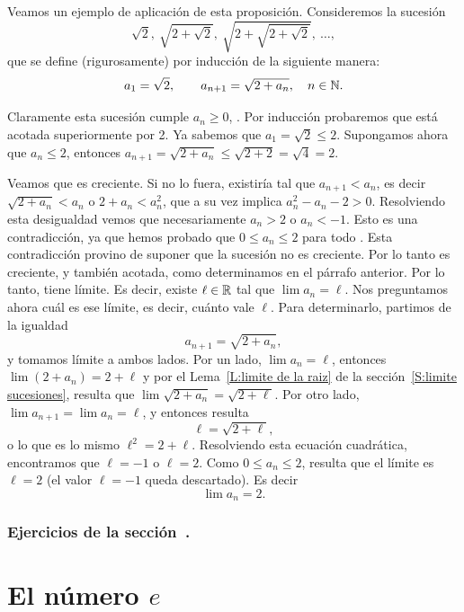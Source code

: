 \begin{example}
Veamos un ejemplo de aplicación de esta proposición. Consideremos la sucesión
\[
\sqrt2,\ \sqrt{2+\sqrt2},\ \sqrt{2+\sqrt{2+\sqrt2}},\ \dots,
\]
que se define (rigurosamente) por inducción de la siguiente manera:
\[
a_1 = \sqrt{2},\qquad
a_{n+1} = \sqrt{2+a_n}, \quad {\ensuremath{n\in\mathbb{N}}}.
\]

Claramente esta sucesión cumple $a_n \ge 0$, \niN.
Por inducción probaremos que está acotada superiormente por 2.
Ya sabemos que $a_1 = \sqrt2 \le 2$. Supongamos ahora que $a_n \le 2$, entonces $a_{n+1} = \sqrt{2 + a_n} \le \sqrt{2 + 2} = \sqrt{4}=2$.

Veamos que es creciente. Si no lo fuera, existiría \niN tal que $a_{n+1} < a_n$, es decir $\sqrt{2+a_n} < a_n$ o $2+a_n < a_n^2$, que a su vez implica $a_n^2 - a_n - 2 > 0$. Resolviendo esta desigualdad vemos que necesariamente $a_n > 2$ o $a_n < -1$. Esto es una contradicción, ya que hemos probado que $0\le a_n \le 2$ para todo \niN. Esta contradicción provino de suponer que la sucesión no es creciente. Por lo tanto es creciente, y también acotada, como determinamos en el párrafo anterior.
Por lo tanto, tiene límite. Es decir, existe $\ell \in \mathbb{R}$ tal que $\lim a_n = \ell$.
Nos preguntamos ahora cuál es ese límite, es decir, cuánto vale $\ell$.
Para determinarlo, partimos de la igualdad 
\[ a_{n+1} = \sqrt{2+a_n}, \]
y tomamos límite a ambos lados.
Por un lado, $\lim a_n = \ell$, entonces $\lim (2+a_n) = 2+\ell$ y por el Lema~\ref{L:limite de la raiz} de la sección~\ref{S:limite sucesiones}, resulta que $\lim \sqrt{2 + a_n} = \sqrt{2+\ell}$.
Por otro lado, $\lim a_{n+1} = \lim a_n = \ell$, y entonces resulta
\[
\ell = \sqrt{2+\ell},
\]
o lo que es lo mismo $\ell^2 = 2 + \ell$. Resolviendo esta ecuación cuadrática, encontramos que $\ell = -1$ o $\ell = 2$. Como $0 \le a_n \le 2$, resulta que el límite es $\ell=2$ (el valor $\ell=-1$ queda descartado). Es decir
\[
\lim a_n = 2.
\]
\end{example}

\subsubsection*{Ejercicios de la sección~.}

\begin{enumerate}

\end{enumerate}

\section{El número \texorpdfstring{$e$}{e}}
\label{S:numero e}


